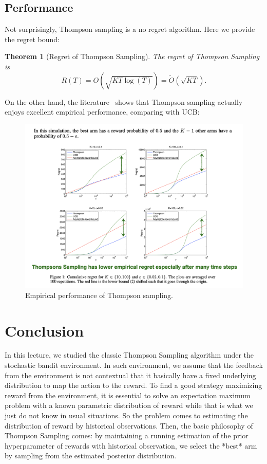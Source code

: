 \documentclass[11pt]{article}
\newtheorem{theorem}{Theorem}
\begin{document}
\subsection{Performance}
Not surprisingly, Thompson sampling is a no regret algorithm. Here we provide the regret bound:
\begin{theorem}[Regret of Thompson Sampling]
The regret of Thompson Sampling is
\[R(T) = O(\sqrt{KT\log(T)}) = \widetilde{O}(\sqrt{KT}).\]
\end{theorem}
On the other hand, the literature~\cite{chapelle2011empirical} shows that Thompson sampling actually enjoys excellent empirical performance, comparing with UCB:
\begin{figure}[H]
    \centering
    \includegraphics[width=1\textwidth]{figure/emp.png}
    \caption{Empirical performance of Thompson sampling.}
    \label{fig:beta}
\end{figure}

\section{Conclusion}
In this lecture, we studied the classic Thompson Sampling algorithm under the stochastic bandit environment. In such environment, we assume that the feedback from the environment is not contextual that it basically have a fixed underlying distribution to map the action to the reward. To find a good strategy maximizing reward from the environment, it is essential to solve an expectation maximum problem with a known parametric distribution of reward while that is what we just do not know in usual situations. So the problem comes to estimating the distribution of reward by historical observations. Then, the basic philosophy of Thompson Sampling comes: by maintaining a running estimation of the prior hyperparameter of rewards with historical observation, we select the *best* arm by sampling from the estimated posterior distribution.
\end{document}
